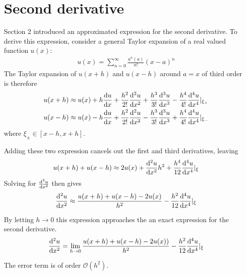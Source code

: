 \documentclass[aps,reprint]{revtex4-1}
\begin{document}
\section{Second derivative}
\label{app:taylor}
Section 2 introduced an approximated expression for the second derivative. To
derive this expression, consider a general Taylor expansion
of a real valued function \(u(x)\):
\begin{align*}
u(x) = \sum_{n = 0}^{\infty}\frac{u^{n}(a)}{n!}(x-a)^{n}
\end{align*}
The Taylor expansion of $u(x+h)$ and $u(x-h)$ around $a = x$
of third order is therefore
\begin{align*}
u(x+h) &\approx u(x) + h\dv{u}{x} + \frac{h^2}{2!}\dv[2]{u}{x} + \frac{h^3}{3!}\dv[3]{u}{x} - \frac{h^{4}}{4!}\dv[4]{u}{x}\rvert_{\xi_{+}} \\
u(x-h) &\approx u(x) - h\dv{u}{x} + \frac{h^2}{2!}\dv[2]{u}{x} - \frac{h^3}{3!}\dv[3]{u}{x} + \frac{h^{4}}{4!}\dv[4]{u}{x}\rvert_{\xi_{-}}
\end{align*}
where \(\xi_{\pm}\in [x-h, x+h]\).

Adding these two expression cancels out the first and third derivatives, leaving
\begin{align*}
  u(x+h) + u(x-h) \approx 2u(x) + \dv[2]{u}{x}h^2 + \frac{h^{4}}{12}\dv[4]{u}{x}\rvert_{\xi}
\end{align*}
Solving for $\dv[2]{u}{x}$ then gives
\begin{align*}
  \dv[2]{u}{x} \approx \frac{u(x+h) + u(x-h) - 2u(x)}{h^2} - \frac{h^{2}}{12}\dv[4]{u}{x}\rvert_{\xi}
\end{align*}

By letting \(h \to 0\) this expression approaches the an exact expression for the second derivative.
\begin{align*}
  \dv[2]{u}{x} = \lim_{h \to 0} \frac{u(x+h) + u(x-h) - 2u(x))}{h^{2}} - \frac{h^{2}}{12}\dv[4]{u}{x}\rvert_{\xi}
\end{align*}

The error term is of order \(\mathcal{O}(h^{2})\). 
\end{document}
